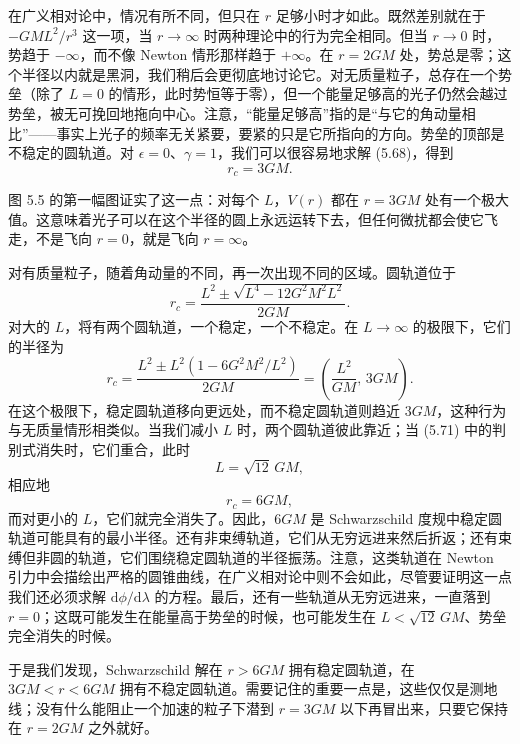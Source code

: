 在广义相对论中，情况有所不同，但只在 $r$ 足够小时才如此。既然差别就在于 $-GML^2/r^3$ 这一项，当 $r \to \infty$ 时两种理论中的行为完全相同。但当 $r \to 0$ 时，势趋于 $-\infty$，而不像 Newton 情形那样趋于 $+\infty$。在 $r = 2GM$ 处，势总是零；这个半径以内就是黑洞，我们稍后会更彻底地讨论它。对无质量粒子，总存在一个势垒（除了 $L = 0$ 的情形，此时势恒等于零），但一个能量足够高的光子仍然会越过势垒，被无可挽回地拖向中心。注意，“能量足够高”指的是“与它的角动量相比”——事实上光子的频率无关紧要，要紧的只是它所指向的方向。势垒的顶部是不稳定的圆轨道。对 $\epsilon = 0$、$\gamma = 1$，我们可以很容易地求解 (5.68)，得到
\begin{equation*}
r_c = 3GM.
\tag{5.70}
\end{equation*}

图 5.5 的第一幅图证实了这一点：对每个 $L$，$V(r)$ 都在 $r = 3GM$ 处有一个极大值。这意味着光子可以在这个半径的圆上永远运转下去，但任何微扰都会使它飞走，不是飞向 $r = 0$，就是飞向 $r = \infty$。

对有质量粒子，随着角动量的不同，再一次出现不同的区域。圆轨道位于
\begin{equation*}
r_c = \frac{L^2 \pm \sqrt{L^4 - 12G^2M^2L^2}}{2GM}.
\tag{5.71}
\end{equation*}
对大的 $L$，将有两个圆轨道，一个稳定，一个不稳定。在 $L \to \infty$ 的极限下，它们的半径为
\begin{equation*}
r_c = \frac{L^2 \pm L^2(1-6G^2M^2/L^2)}{2GM} = \left(\frac{L^2}{GM},\, 3GM\right).
\tag{5.72}
\end{equation*}
在这个极限下，稳定圆轨道移向更远处，而不稳定圆轨道则趋近 $3GM$，这种行为与无质量情形相类似。当我们减小 $L$ 时，两个圆轨道彼此靠近；当 (5.71) 中的判别式消失时，它们重合，此时
\begin{equation*}
L = \sqrt{12}\,GM,
\tag{5.73}
\end{equation*}
相应地
\begin{equation*}
r_c = 6GM,
\tag{5.74}
\end{equation*}
而对更小的 $L$，它们就完全消失了。因此，$6GM$ 是 Schwarzschild 度规中稳定圆轨道可能具有的最小半径。还有非束缚轨道，它们从无穷远进来然后折返；还有束缚但非圆的轨道，它们围绕稳定圆轨道的半径振荡。注意，这类轨道在 Newton 引力中会描绘出严格的圆锥曲线，在广义相对论中则不会如此，尽管要证明这一点我们还必须求解 $\mathrm{d}\phi/\mathrm{d}\lambda$ 的方程。最后，还有一些轨道从无穷远进来，一直落到 $r = 0$；这既可能发生在能量高于势垒的时候，也可能发生在 $L < \sqrt{12}\,GM$、势垒完全消失的时候。

于是我们发现，Schwarzschild 解在 $r > 6GM$ 拥有稳定圆轨道，在 $3GM < r < 6GM$ 拥有不稳定圆轨道。需要记住的重要一点是，这些仅仅是测地线；没有什么能阻止一个加速的粒子下潜到 $r = 3GM$ 以下再冒出来，只要它保持在 $r = 2GM$ 之外就好。

